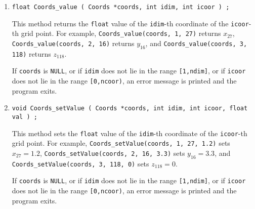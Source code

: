 \begin{enumerate}
\item
\begin{verbatim}
float Coords_value ( Coords *coords, int idim, int icoor ) ;
\end{verbatim}
This method returns the {\tt float} value of the {\tt idim}-th
coordinate of the {\tt icoor}-th grid point.
For example, {\tt Coords\_value(coords, 1, 27)} returns $x_{27}$,
{\tt Coords\_value(coords, 2, 16)} returns $y_{16}$,
and {\tt Coords\_value(coords, 3, 118)} returns $z_{118}$.
\par {}
If {\tt coords} is {\tt NULL},
or if {\tt idim} does not lie in the range {\tt [1,ndim]},
or if {\tt icoor} does not lie in the range {\tt [0,ncoor)},
an error message is printed and the program exits.
\item
\begin{verbatim}
void Coords_setValue ( Coords *coords, int idim, int icoor, float val ) ;
\end{verbatim}
This method sets the {\tt float} value of the {\tt idim}-th
coordinate of the {\tt icoor}-th grid point.
For example, 
{\tt Coords\_setValue(coords, 1, 27, 1.2)} sets $x_{27} = 1.2$,
{\tt Coords\_setValue(coords, 2, 16, 3.3)} sets $y_{16} = 3.3$,
and {\tt Coords\_setValue(coords, 3, 118, 0)} sets $z_{118} = 0$.
\par {}
If {\tt coords} is {\tt NULL},
or if {\tt idim} does not lie in the range {\tt [1,ndim]},
or if {\tt icoor} does not lie in the range {\tt [0,ncoor)},
an error message is printed and the program exits.
\end{enumerate}
\par
